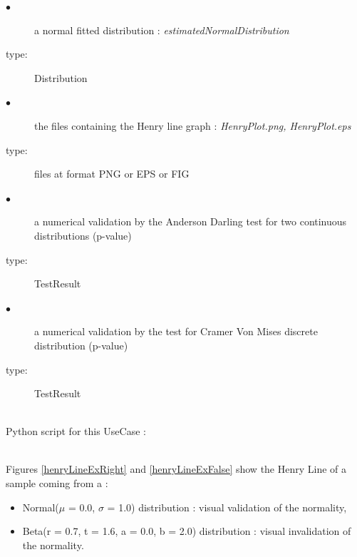              {
               \begin{description}
               \item[$\bullet$] a normal fitted distribution : {\itshape estimatedNormalDistribution}
               \item[type:]  Distribution
               \item[$\bullet$] the files containing the Henry line graph : {\itshape HenryPlot.png, HenryPlot.eps}
               \item[type:] files at format PNG or EPS or FIG
               \item[$\bullet$] a numerical validation by the Anderson Darling test for two continuous distributions (p-value)
               \item[type:] TestResult
               \item[$\bullet$] a numerical validation by the  test for Cramer Von Mises discrete distribution (p-value)
               \item[type:] TestResult
               \end{description}
             }

             \textspace\\
             Python script for this UseCase :


             \textspace\\

             Figures \ref{henryLineExRight} and \ref{henryLineExFalse} show the Henry Line of a sample coming from a  :
             \begin{itemize}
             \item  Normal($\mu$ = 0.0, $\sigma$ = 1.0) distribution : visual validation of the normality,
             \item  Beta(r = 0.7, t = 1.6, a = 0.0, b = 2.0) distribution : visual invalidation of the normality.
             \end{itemize}



